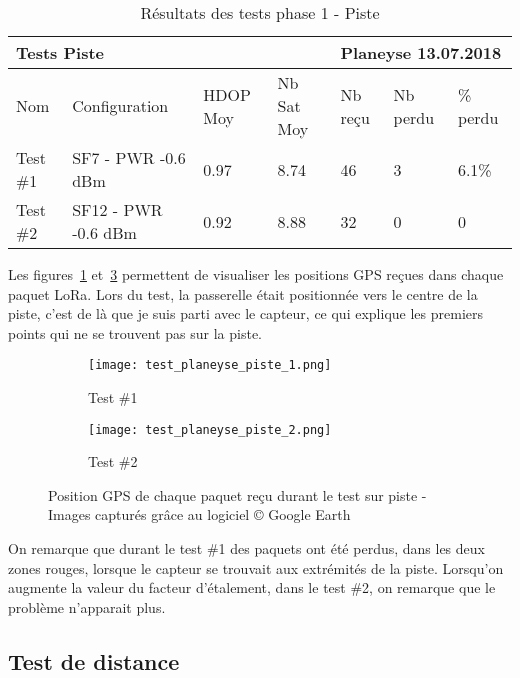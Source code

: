 \begin{table}[htb]
\caption[Résultats des tests phase 1 - Piste]{Résultats des tests phase 1 - Piste}
\label{tab:resultat_test_1_piste}
\centering
\begin{tabular}{lllllll}
\toprule
\multicolumn{4}{l}{ Tests Piste } & \multicolumn{3}{l}{ Planeyse 13.07.2018 } \\
\toprule
Nom & Configuration & HDOP Moy & Nb Sat Moy & Nb reçu & Nb perdu & \% perdu \\
\midrule
Test \#1 & SF7 - PWR -0.6 dBm & 0.97 & 8.74 & 46 & 3 & 6.1\% \\
Test \#2 & SF12 - PWR -0.6 dBm & 0.92 & 8.88 & 32 & 0 & 0  \\
\bottomrule 
\end{tabular}
\end{table}

Les figures~\ref{fig:test_piste_1} et~\ref{fig:test_piste_2} permettent de visualiser les positions GPS reçues dans chaque paquet LoRa. Lors du test, la passerelle était positionnée vers le centre de la piste, c'est de là que je suis parti avec le capteur, ce qui explique les premiers points qui ne se trouvent pas sur la piste.

\begin{figure}[htb]
\label{tab:resultat_tests_piste}
\centering
\begin{subfigure}[b]{1\textwidth}
   \texttt{[image: test\_planeyse\_piste\_1.png]}
   \caption{Test \#1}
   \label{fig:test_piste_1}
\end{subfigure}

\begin{subfigure}[b]{1\textwidth}
   \texttt{[image: test\_planeyse\_piste\_2.png]}
   \caption{Test \#2}
   \label{fig:test_piste_2}
\end{subfigure}
\caption[Positions GPS des tests piste]{Position GPS de chaque paquet reçu durant le test sur piste - Images capturés grâce au logiciel © Google Earth}
\end{figure}

On remarque que durant le test \#1 des paquets ont été perdus, dans les deux zones rouges, lorsque le capteur se trouvait aux extrémités de la piste. Lorsqu'on augmente la valeur du facteur d'étalement, dans le test \#2, on remarque que le problème n'apparait plus.

\subsection{Test de distance}

